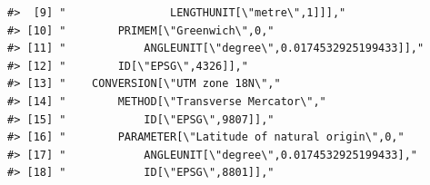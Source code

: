 \documentclass[
]{book}
\begin{document}
\begin{verbatim}
#>  [9] "                LENGTHUNIT[\"metre\",1]]],"                                                                                                                                                                                                                                     
#> [10] "        PRIMEM[\"Greenwich\",0,"                                                                                                                                                                                                                                                
#> [11] "            ANGLEUNIT[\"degree\",0.0174532925199433]],"                                                                                                                                                                                                                         
#> [12] "        ID[\"EPSG\",4326]],"                                                                                                                                                                                                                                                    
#> [13] "    CONVERSION[\"UTM zone 18N\","                                                                                                                                                                                                                                               
#> [14] "        METHOD[\"Transverse Mercator\","                                                                                                                                                                                                                                        
#> [15] "            ID[\"EPSG\",9807]],"                                                                                                                                                                                                                                                
#> [16] "        PARAMETER[\"Latitude of natural origin\",0,"                                                                                                                                                                                                                            
#> [17] "            ANGLEUNIT[\"degree\",0.0174532925199433],"                                                                                                                                                                                                                          
#> [18] "            ID[\"EPSG\",8801]],"                                                                                                                                                                                                                                                

\end{verbatim}
\end{document}
